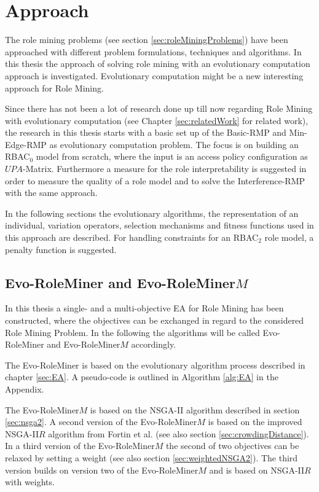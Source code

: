 \newpage
\chapter{Approach}
\label{sec:approach}
The role mining problems (see section \ref{sec:roleMiningProblems}) have been approached with different problem formulations, techniques and algorithms. In this thesis the approach of solving role mining with an evolutionary computation approach is investigated. Evolutionary computation might be a new interesting approach for Role Mining.

Since there has not been a lot of research done up till now regarding Role Mining with evolutionary computation (see Chapter \ref{sec:relatedWork} for related work), the research in this thesis starts with a basic set up of the Basic-RMP and Min-Edge-RMP as evolutionary computation problem. The focus is on building an RBAC$_0$ model from scratch, where the input is an access policy configuration as $UPA$-Matrix. Furthermore a measure for the role interpretability is suggested in order to measure the quality of a role model and to solve the Interference-RMP with the same approach.  

In the following sections the evolutionary algorithms, the representation of an individual, variation operators, selection mechanisms and fitness functions used in this approach are described. For handling constraints for an RBAC$_2$ role model, a penalty function is suggested.

	\section{Evo-RoleMiner and Evo-RoleMiner$M$}
	\label{sec:EvoRoleMiner}
	In this thesis a single- and a multi-objective EA for Role Mining has been constructed, where the objectives can be exchanged in regard to the considered Role Mining Problem. In the following the algorithms will be called Evo-RoleMiner and Evo-RoleMiner$M$ accordingly.
	
	The Evo-RoleMiner is based on the evolutionary algorithm process described in chapter \ref{sec:EA}. A pseudo-code is outlined in Algorithm \ref{alg:EA} in the Appendix.
	
	The Evo-RoleMiner$M$ is based on the NSGA-II algorithm described in section \ref{sec:nsga2}. A second version of the Evo-RoleMiner$M$ is based on the improved NSGA-II$R$ algorithm from Fortin et al.\cite{Fortin:2013} (see also section \ref{sec:crowdingDistance}). In a third version of the Evo-RoleMiner$M$ the second of two objectives can be relaxed by setting a weight (see also section \ref{sec:weightedNSGA2}). The third version builds on version two of the Evo-RoleMiner$M$ and is based on NSGA-II$R$ with weights.
    
